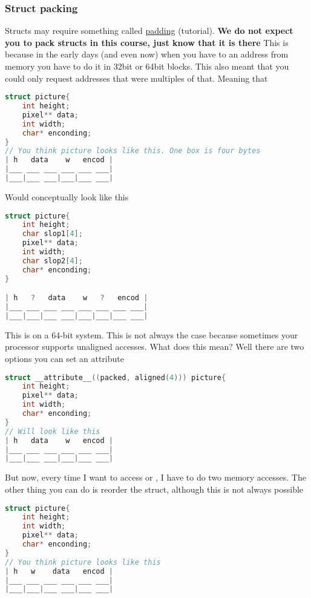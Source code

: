 \begin{aside}

\subsubsection{Struct packing}

Structs may require something called \href{http://www.catb.org/esr/structure-packing/}{padding} (tutorial). \textbf{We do not expect you to pack structs in this course, just know that it is there} This is because in the early days (and even now) when you have to an address from memory you have to do it in 32bit or 64bit blocks. This also meant that you could only request addresses that were multiples of that. Meaning that

\begin{lstlisting}[language=C]
struct picture{
    int height;
    pixel** data;
    int width;
    char* enconding;
}
// You think picture looks like this. One box is four bytes
| h   data    w   encod |
|___ ___ ___ ___ ___ ___|
|___|___ ___|___|___ ___|
\end{lstlisting}

Would conceptually look like this

\begin{lstlisting}[language=C]
struct picture{
    int height;
    char slop1[4];
    pixel** data;
    int width;
    char slop2[4];
    char* enconding;
}

| h   ?   data    w   ?   encod |
|___ ___ ___ ___ ___ ___ ___ ___|
|___|___|___ ___|___|___|___ ___|
\end{lstlisting}

This is on a 64-bit system. This is not always the case because
sometimes your processor supports unaligned accesses. What does this
mean? Well there are two options you can set an attribute

\begin{lstlisting}[language=C]
struct __attribute__((packed, aligned(4))) picture{
    int height;
    pixel** data;
    int width;
    char* enconding;
}
// Will look like this
| h   data    w   encod |
|___ ___ ___ ___ ___ ___|
|___|___ ___|___|___ ___|

\end{lstlisting}

But now, every time I want to access  or ,
I have to do two memory accesses. The other thing you can do is reorder
the struct, although this is not always possible

\begin{lstlisting}[language=C]
struct picture{
    int height;
    int width;
    pixel** data;
    char* enconding;
}
// You think picture looks like this
| h   w    data   encod |
|___ ___ ___ ___ ___ ___|
|___|___|___ ___|___ ___|

\end{lstlisting}

\end{aside}

